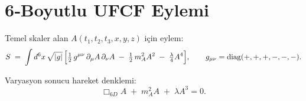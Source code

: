 \section*{6‑Boyutlu UFCF Eylemi}

Temel skaler alan $A(t_1,t_2,t_3,x,y,z)$ için eylem:
\[
S \;=\; \int d^{6}x \,\sqrt{|g|}\,
\Bigl[
  \tfrac12\,g^{\mu\nu}\,\partial_\mu A\,\partial_\nu A
  \;-\;
  \tfrac12\,m_A^{2}A^{2}
  \;-\;
  \tfrac{\lambda}{4}A^{4}
\Bigr],
\qquad
g_{\mu\nu}=\mathrm{diag}(+,+,+,-,-,-).
\]

Varyasyon sonucu hareket denklemi:
\[
\Box_{6D} A \;+\; m_A^{2}A \;+\; \lambda A^{3}=0.
\]
